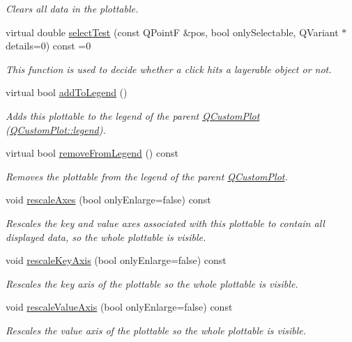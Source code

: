\begin{DoxyCompactItemize}
\begin{DoxyCompactList}\small\item\em Clears all data in the plottable. \end{DoxyCompactList}\item 
virtual double \hyperlink{classQCPAbstractPlottable_a1fc81aa273e9e8db84c1056bc0181fdb}{select\+Test} (const Q\+Point\+F \&pos, bool only\+Selectable, Q\+Variant $\ast$details=0) const  =0
\begin{DoxyCompactList}\small\item\em This function is used to decide whether a click hits a layerable object or not. \end{DoxyCompactList}\item 
virtual bool \hyperlink{classQCPAbstractPlottable_a70f8cabfd808f7d5204b9f18c45c13f5}{add\+To\+Legend} ()
\begin{DoxyCompactList}\small\item\em Adds this plottable to the legend of the parent \hyperlink{classQCustomPlot}{Q\+Custom\+Plot} (\hyperlink{classQCustomPlot_a4eadcd237dc6a09938b68b16877fa6af}{Q\+Custom\+Plot\+::legend}). \end{DoxyCompactList}\item 
virtual bool \hyperlink{classQCPAbstractPlottable_aa1f350e510326d012b9a9c9249736c83}{remove\+From\+Legend} () const 
\begin{DoxyCompactList}\small\item\em Removes the plottable from the legend of the parent \hyperlink{classQCustomPlot}{Q\+Custom\+Plot}. \end{DoxyCompactList}\item 
void \hyperlink{classQCPAbstractPlottable_a7e8fc3be43c27ccacd70a7bf9d74a5cd}{rescale\+Axes} (bool only\+Enlarge=false) const 
\begin{DoxyCompactList}\small\item\em Rescales the key and value axes associated with this plottable to contain all displayed data, so the whole plottable is visible. \end{DoxyCompactList}\item 
void \hyperlink{classQCPAbstractPlottable_a1acecfcca3e7fcda00fcbaa3c886386f}{rescale\+Key\+Axis} (bool only\+Enlarge=false) const 
\begin{DoxyCompactList}\small\item\em Rescales the key axis of the plottable so the whole plottable is visible. \end{DoxyCompactList}\item 
void \hyperlink{classQCPAbstractPlottable_abfd0805eb1d955c0111a990246658324}{rescale\+Value\+Axis} (bool only\+Enlarge=false) const 
\begin{DoxyCompactList}\small\item\em Rescales the value axis of the plottable so the whole plottable is visible. \end{DoxyCompactList}\end{DoxyCompactItemize}
